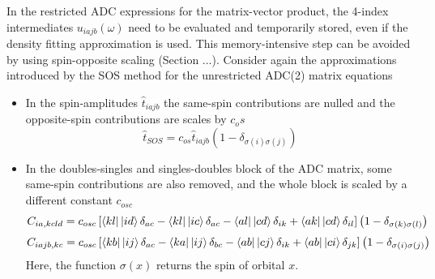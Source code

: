 In the restricted ADC expressions for the matrix-vector product, the 4-index intermediates $u_{iajb}(\omega)$ need to be evaluated and temporarily stored, even if the density fitting approximation is used. This memory-intensive step can be avoided by using spin-opposite scaling (Section ...). Consider again the approximations introduced by the SOS method for the unrestricted ADC(2) matrix equations
\begin{itemize}
\item In the spin-amplitudes $\hat{t}_{iajb}$ the same-spin contributions are nulled and the opposite-spin contributions are scales by $c_os$
\begin{equation}
\hat{t}_{SOS} = c_{os} \hat{t}_{iajb} \left( 1 - \delta_{\sigma (i) \sigma (j)} \right)
\end{equation}
\item In the doubles-singles and singles-doubles block of the ADC matrix, some same-spin contributions are also removed, and the whole block is scaled by a different constant $c_{osc}$ 
\begin{equation}
C_{ia,kcld} = c_{osc} \left[ \bra{kl} {} \ket{id} \delta_{ac} - \bra{kl} {} \ket{ic} \delta_{ac} - \bra{al} {} \ket{cd} \delta_{ik} + \bra{ak} {} \ket{cd}\delta_{il} \right] \left( 1 - \delta_{\sigma (k) \sigma (l)} \right)
\end{equation}
\begin{equation}
C_{iajb,kc} = c_{osc} \left[ \bra{kb} {} \ket{ij} \delta_{ac} - \bra{ka} {} \ket{ij} \delta_{bc} - \bra{ab} {} \ket{cj} \delta_{ik} + \bra{ab} {} \ket{ci}\delta_{jk} \right] \left( 1 - \delta_{\sigma (i) \sigma (j)} \right)
\end{equation}
\noindent Here, the function $\sigma(x)$ returns the spin of orbital $x$.
\end{itemize}

